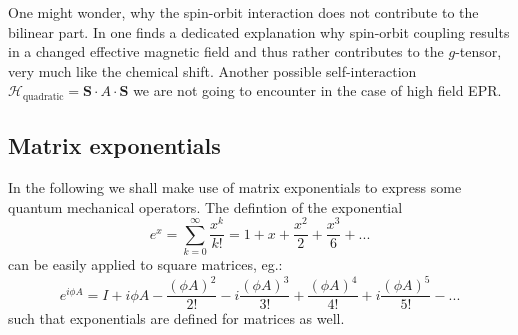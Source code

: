 \documentclass[11.5pt,a4paper]{article}
\begin{document}
  One might wonder, why the spin-orbit interaction does not contribute to the bilinear part. In \cite[chap 11.2, p. 505ff]{slichter} one finds a dedicated explanation why spin-orbit coupling results in a changed effective magnetic field and thus rather contributes to the $g$-tensor, very much like the chemical shift.
  Another possible self-interaction $\mathcal{H}_\text{quadratic} = \mathbf{S} \cdot A \cdot \mathbf{S}$ we are not going to encounter in the case of high field EPR.

\subsection{Matrix exponentials}
In the following we shall make use of matrix exponentials to express some quantum mechanical operators. The defintion of the exponential
\begin{equation}
 e^x = \sum_{k=0}^\infty \frac{x^k}{k!} = 1 + x + \frac{x^2}{2} + \frac{x^3}{6} + ...
\end{equation}
can be easily applied to square matrices, eg.:
\begin{equation}
 e^{i \phi A } = I + i \phi A - \frac{(\phi A)^2}{2!} - i \frac{(\phi A)^3}{3!} + \frac{(\phi A)^4}{4!} + i \frac{(\phi A)^5}{5!} - ...
\end{equation}
such that exponentials are defined for matrices as well.

\end{document}

